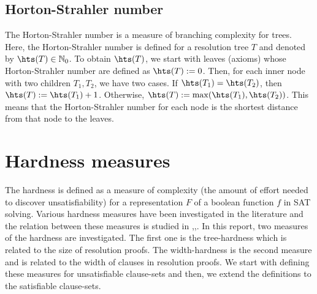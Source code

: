 \documentclass[]{book}
\begin{document}
\section{Horton-Strahler number}
\label{sec:hs}

The Horton-Strahler number is a measure of branching complexity for trees. Here, the Horton-Strahler number is defined for a resolution tree $T$ and denoted by $\hts(T) \in \NNZ$. To obtain $\hts(T)$, we start with leaves (axioms) whose Horton-Strahler number are defined as $\hts(T) := 0$. Then, for each inner node with two children $T_1, T_2$, we have two cases. If $\hts(T_1)= \hts(T_2)$, then $\hts(T) := \hts(T_1)+ 1$. Otherwise, $\hts(T) := \max(\hts(T_1),\hts(T_2))$. This means that the Horton-Strahler number for each node is the shortest distance from that node to the leaves.


\chapter{Hardness measures}
\label{cha:Hardness Measures}

The hardness is defined as a measure of complexity (the amount of effort needed to discover unsatisfiability) for a representation $F$ of a boolean function $f$ in SAT solving. Various hardness measures have been investigated in the literature and the relation between these measures is studied in \cite{h5},\cite{h18},\cite{h8}. In this report, two measures of the hardness are investigated. The first one is the tree-hardness which is related to the size of resolution proofs. The width-hardness is the second measure and is related to the width of clauses in resolution proofs. We start with defining these measures for unsatisfiable clause-sets and then, we extend the definitions to the satisfiable clause-sets. 
\end{document}
